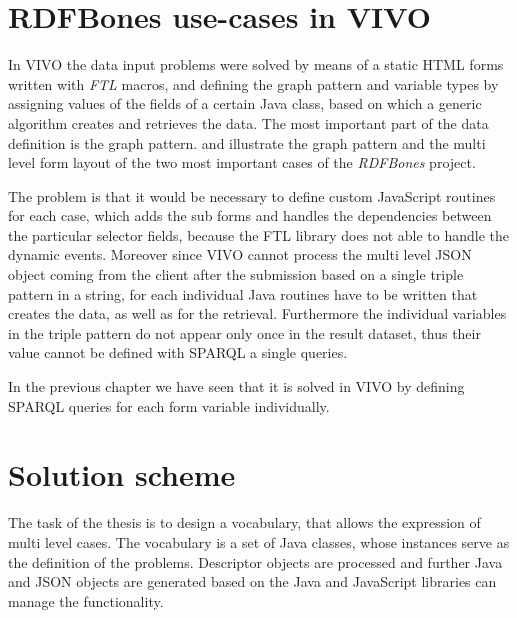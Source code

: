 \section{RDFBones use-cases in VIVO}

In VIVO the data input problems were solved by means of a static HTML forms written with \textit{FTL} macros, and defining the graph pattern and variable types by assigning values of the fields of a certain Java class, based on which a generic algorithm creates and retrieves the data. The most important part of the data definition is the graph pattern.  and  illustrate the graph pattern and the multi level form layout of the two most important cases of the \textit{RDFBones} project. 



The problem is that it would be necessary to define custom JavaScript routines for each case, which adds the sub forms and handles the dependencies between the particular selector fields, because the FTL library does not able to handle the dynamic events. Moreover since VIVO cannot process the multi level JSON object coming from the client after the submission based on a single triple pattern in a string, for each individual Java routines have to be written that creates the data, as well as for the retrieval. Furthermore the individual variables in the triple pattern do not appear only once in the result dataset, thus their value cannot be defined with SPARQL a single queries.

In the previous chapter we have seen that it is solved in VIVO by defining SPARQL queries for each form variable individually.




\section{Solution scheme}

The task of the thesis is to design a vocabulary, that allows the expression of multi level cases. The vocabulary is a set of Java classes, whose instances serve as the definition of the problems. Descriptor objects are processed and further Java and JSON objects are generated based on the Java and JavaScript libraries can manage the functionality.

